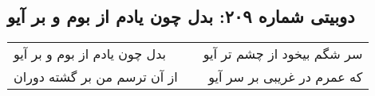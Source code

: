 \begin{center}
\section*{دوبیتی شماره ۲۰۹: بدل چون یادم از بوم و بر آیو}
\label{sec:209}
\begin{longtable}{l p{0.5cm} r}
بدل چون یادم از بوم و بر آیو
&&
سر شگم بیخود از چشم تر آیو
\\
از آن ترسم من بر گشته دوران
&&
که عمرم در غریبی بر سر آیو
\\
\end{longtable}
\end{center}
